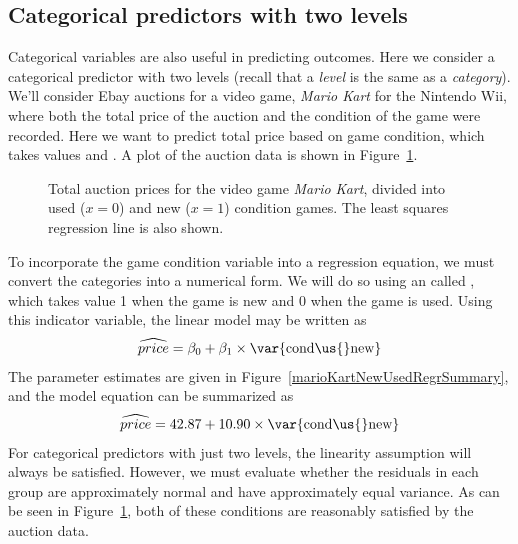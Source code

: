 

\subsection{Categorical predictors with two levels}
\label{categoricalPredictorsWithTwoLevels}

Categorical variables are also useful in predicting outcomes.
Here we consider a categorical predictor with two levels
(recall that a \emph{level} is the same as a \emph{category}).
We'll consider Ebay auctions for a video game, \emph{Mario Kart}
for the Nintendo Wii, where both the total price of the auction
and the condition of the game were recorded.
Here we want to predict total price based on game condition,
which takes values  and .
A plot of the auction data is shown in Figure~\ref{marioKartNewUsed}.

\begin{figure}[h]
  \centering
  \caption{Total auction prices for the video game
      \emph{Mario Kart}, divided into used ($x=0$)
      and new ($x=1$) condition games.
      The least squares regression line is also shown.}
  \label{marioKartNewUsed}
\end{figure}

To incorporate the game condition variable into a regression
equation, we must convert the categories into a numerical form.
We will do so using an 
called , which takes value 1 when the game
is new and 0 when the game is used.
Using this indicator variable, the linear model may be written as
\begin{align*}
\widehat{price} = \beta_0 + \beta_1 \times \text{\var{cond\us{}new}}
\end{align*}
The parameter estimates are given in
Figure~\ref{marioKartNewUsedRegrSummary},
and the model equation can be summarized as
\begin{align*}
\widehat{price} = 42.87 + 10.90 \times \text{\var{cond\us{}new}}
\end{align*}
For categorical predictors with just two levels,
the linearity assumption will always be satisfied.
However, we must evaluate whether the residuals in
each group are approximately normal and have approximately
equal variance.
As can be seen in Figure~\ref{marioKartNewUsed},
both of these conditions are reasonably satisfied
by the auction data.


